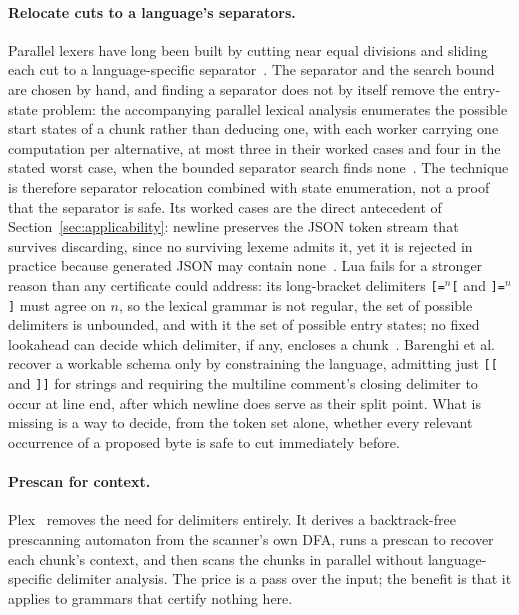 \documentclass[11pt,a4paper]{article}
\theoremstyle{definition}
\theoremstyle{plain}
\newcommand{\code}[1]{\texttt{#1}}
\begin{document}
\paragraph{Relocate cuts to a language's separators.} Parallel lexers have long been built by cutting near equal
divisions and sliding each cut to a language-specific separator~\cite{barenghi2015parallel}. The separator and the
search bound are chosen by hand, and finding a separator does not by itself remove the entry-state problem: the
accompanying parallel lexical analysis enumerates the possible start states of a chunk rather than deducing one, with
each worker carrying one computation per alternative, at most three in their worked cases and four in the stated worst
case, when the bounded separator search finds none~\cite{barenghi2015parallel}. The technique is therefore separator
relocation combined with state enumeration, not a proof that the separator is safe. Its worked cases are the direct
antecedent of Section~\ref{sec:applicability}: newline preserves the JSON token stream that survives discarding, since
no surviving lexeme admits it, yet it is rejected in practice because generated JSON may contain
none~\cite{li2021plex}. Lua fails for a stronger reason than any certificate could address: its long-bracket
delimiters \code{[=$^n$[} and \code{]=$^n$]} must agree on $n$, so the lexical grammar is not regular, the set of
possible delimiters is unbounded, and with it the set of possible entry states; no fixed lookahead can decide which
delimiter, if any, encloses a chunk~\cite{barenghi2015parallel}. Barenghi et al. recover a workable schema only by
constraining the language, admitting just \code{[[} and \code{]]} for strings and requiring the multiline comment's
closing delimiter to occur at line end, after which newline does serve as their split point. What is missing is a way
to decide, from the token set alone, whether every relevant occurrence of a proposed byte is safe to cut immediately
before.

\paragraph{Prescan for context.} Plex~\cite{li2021plex} removes the need for delimiters entirely. It derives a
backtrack-free prescanning automaton from the scanner's own DFA, runs a prescan to recover each chunk's context, and
then scans the chunks in parallel without language-specific delimiter analysis. The price is a pass over the input;
the benefit is that it applies to grammars that certify nothing here.
\end{document}
